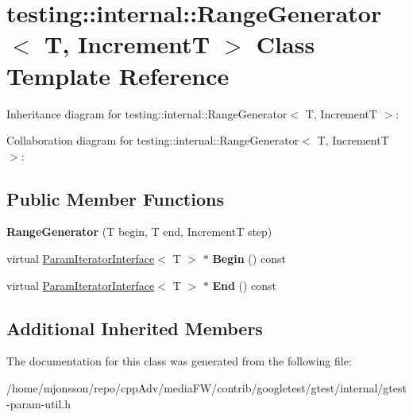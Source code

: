 \hypertarget{classtesting_1_1internal_1_1RangeGenerator}{}\section{testing\+:\+:internal\+:\+:Range\+Generator$<$ T, IncrementT $>$ Class Template Reference}
\label{classtesting_1_1internal_1_1RangeGenerator}


Inheritance diagram for testing\+:\+:internal\+:\+:Range\+Generator$<$ T, IncrementT $>$\+:


Collaboration diagram for testing\+:\+:internal\+:\+:Range\+Generator$<$ T, IncrementT $>$\+:
\subsection*{Public Member Functions}
\begin{DoxyCompactItemize}
\item 
\mbox{\label{classtesting_1_1internal_1_1RangeGenerator_a5b3b83223b9cada3569bcee729e0fdf3}} 
{\bfseries Range\+Generator} (T begin, T end, IncrementT step)
\item 
\mbox{\label{classtesting_1_1internal_1_1RangeGenerator_ae68b59f9348ecf93e0947545a2424765}} 
virtual \hyperlink{classtesting_1_1internal_1_1ParamIteratorInterface}{Param\+Iterator\+Interface}$<$ T $>$ $\ast$ {\bfseries Begin} () const
\item 
\mbox{\label{classtesting_1_1internal_1_1RangeGenerator_a8d2acbb733791a14df6e7bd3754e9003}} 
virtual \hyperlink{classtesting_1_1internal_1_1ParamIteratorInterface}{Param\+Iterator\+Interface}$<$ T $>$ $\ast$ {\bfseries End} () const
\end{DoxyCompactItemize}
\subsection*{Additional Inherited Members}


The documentation for this class was generated from the following file\+:\begin{DoxyCompactItemize}
\item 
/home/mjonsson/repo/cpp\+Adv/media\+F\+W/contrib/googletest/gtest/internal/gtest-\/param-\/util.\+h\end{DoxyCompactItemize}
